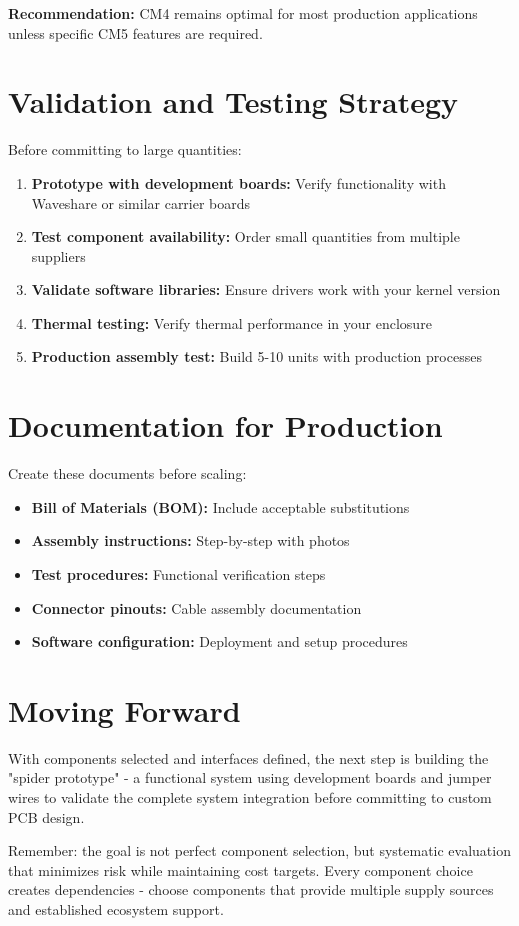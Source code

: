 \textbf{Recommendation:} CM4 remains optimal for most production applications unless specific CM5 features are required.

\section{Validation and Testing Strategy}

Before committing to large quantities:

\begin{enumerate}
\item \textbf{Prototype with development boards:} Verify functionality with Waveshare or similar carrier boards
\item \textbf{Test component availability:} Order small quantities from multiple suppliers
\item \textbf{Validate software libraries:} Ensure drivers work with your kernel version
\item \textbf{Thermal testing:} Verify thermal performance in your enclosure
\item \textbf{Production assembly test:} Build 5-10 units with production processes
\end{enumerate}

\section{Documentation for Production}

Create these documents before scaling:

\begin{itemize}
\item \textbf{Bill of Materials (BOM):} Include acceptable substitutions
\item \textbf{Assembly instructions:} Step-by-step with photos
\item \textbf{Test procedures:} Functional verification steps
\item \textbf{Connector pinouts:} Cable assembly documentation
\item \textbf{Software configuration:} Deployment and setup procedures
\end{itemize}

\section{Moving Forward}

With components selected and interfaces defined, the next step is building the "spider prototype" - a functional system using development boards and jumper wires to validate the complete system integration before committing to custom PCB design.

Remember: the goal is not perfect component selection, but systematic evaluation that minimizes risk while maintaining cost targets. Every component choice creates dependencies - choose components that provide multiple supply sources and established ecosystem support.